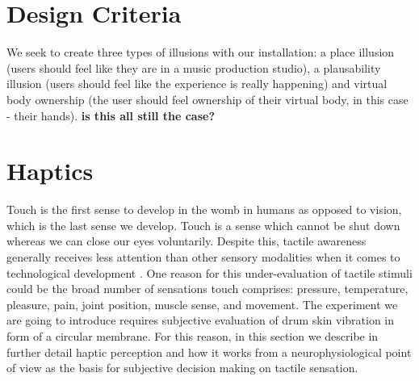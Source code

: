 \documentclass{vgtc}
\begin{document}

\section{Design Criteria}\label{sec:Design_criteria}

We seek to create three types of illusions with our installation: a place illusion (users should feel like they are in a music production studio), a plausability illusion (users should feel like the experience is really happening) and virtual body ownership (the user should feel ownership of their virtual body, in this case - their hands). \textbf{is this all still the case?}

\section{Haptics}\label{sec:haptics}
Touch is the first sense to develop in the womb in humans \cite{Barnett1972} as opposed to vision, which is the last sense we develop. Touch is a sense which cannot be shut down whereas we can close our eyes voluntarily. Despite this, tactile awareness generally receives less attention than other sensory modalities when it comes to technological development \cite{Gallace2012}. One reason for this under-evaluation of tactile stimuli could be the broad number of sensations touch comprises: pressure, temperature, pleasure, pain, joint position, muscle sense, and movement. The experiment we are going to introduce requires subjective evaluation of drum skin vibration in form of a circular membrane. For this reason, in this section we describe in further detail haptic perception and how it works from a neurophysiological point of view as the basis for subjective decision making on tactile sensation.
\end{document}
